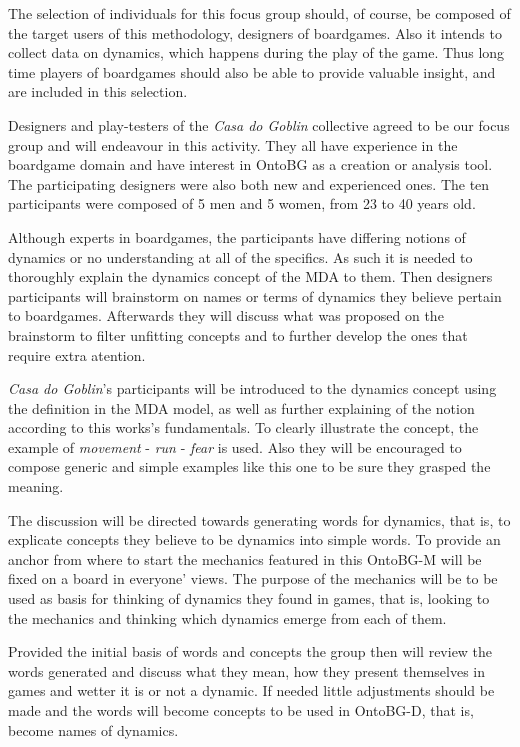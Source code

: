 The selection of individuals for this focus group should, of course, be composed of the target users of this methodology, designers of boardgames. Also it intends to collect data on dynamics, which happens during the play of the game. Thus long time players of boardgames should also be able to provide valuable insight, and are included in this selection. 

Designers and play-testers of the \textit{Casa do Goblin} collective agreed to be our focus group and will endeavour in this activity. They all have experience in the boardgame domain and have interest in OntoBG as a creation or analysis tool. The participating designers were also both new and experienced ones. The ten participants were composed of 5 men and 5 women, from 23 to 40 years old.

Although experts in boardgames, the participants have differing notions of dynamics or no understanding at all of the specifics. As such it is needed to thoroughly explain the dynamics concept of the MDA to them. Then designers participants will brainstorm on names or terms of dynamics they believe pertain to boardgames. Afterwards they will discuss what was proposed on the brainstorm to filter unfitting concepts and to further develop the ones that require extra atention.

\textit{Casa do Goblin}'s participants will be introduced to the dynamics concept using the definition in the MDA model, as well as further explaining of the notion according to this works's fundamentals. To clearly illustrate the concept, the example of \textit{movement} - \textit{run} - \textit{fear}  is used. Also they will be encouraged to compose generic and simple examples like this one to be sure they grasped the meaning. 

The discussion will be directed towards generating words for dynamics, that is, to explicate concepts they believe to be dynamics into simple words. To provide an anchor from where to start the mechanics featured in this OntoBG-M will be fixed on a board in everyone' views. The purpose of the mechanics will be to be used as basis for thinking of dynamics they found in games, that is, looking to the mechanics and thinking which dynamics emerge from each of them.

Provided the initial basis of words and concepts the group then will review the words generated and discuss what they mean, how they present themselves in games and wetter it is or not a dynamic. If needed little adjustments should be made and the words will become concepts to be used in OntoBG-D, that is, become names of dynamics.

